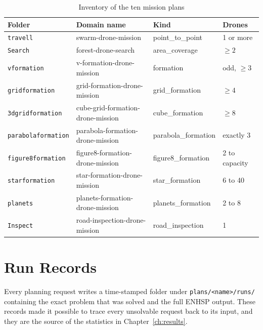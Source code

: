 \documentclass[11pt,a4paper,oneside]{report}
\newcommand{\code}[1]{\texttt{#1}}
\begin{document}
\begin{table}[H]
\caption{Inventory of the ten mission plans}\label{tab:inventory}
\small
\begin{tabularx}{\textwidth}{@{}l>{\ttfamily\footnotesize}P{0.36\textwidth}lY@{}}
\toprule
\textbf{Folder} & \textbf{\normalfont\small Domain name} & \textbf{Kind} & \textbf{Drones} \\
\midrule
\code{travell}           & swarm-drone-mission               & point\_to\_point    & 1 or more \\
\code{Search}            & forest-drone-search               & area\_coverage      & $\geq 2$ \\
\code{vformation}        & v-formation-drone-mission         & formation           & odd, $\geq 3$ \\
\code{gridformation}     & grid-formation-drone-mission      & grid\_formation     & $\geq 4$ \\
\code{3dgridformation}   & cube-grid-formation-drone-mission & cube\_formation     & $\geq 8$ \\
\code{parabolaformation} & parabola-formation-drone-mission  & parabola\_formation & exactly 3 \\
\code{figure8formation}  & figure8-formation-drone-mission   & figure8\_formation  & 2 to capacity \\
\code{starformation}     & star-formation-drone-mission      & star\_formation     & 6 to 40 \\
\code{planets}           & planets-formation-drone-mission   & planets\_formation  & 2 to 8 \\
\code{Inspect}           & road-inspection-drone-mission     & road\_inspection    & 1 \\
\bottomrule
\end{tabularx}
\end{table}

\section{Run Records}
Every planning request writes a time-stamped folder under \code{plans/<name>/runs/} containing
the exact problem that was solved and the full ENHSP output. These records made it possible to
trace every unsolvable request back to its input, and they are the source of the statistics in
Chapter~\ref{ch:results}.

\end{document}
